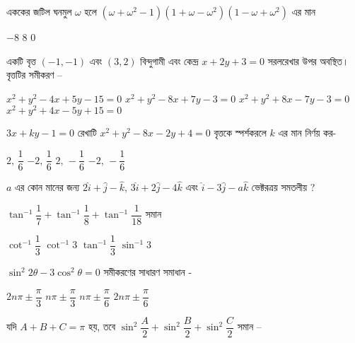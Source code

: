 \documentclass[addpoints]{exam}
\begin{document}
\begin{questions}
\question  এককের জটিল ঘনমুল $ \omega $ হলে $ (\omega +\omega^{2}-1)(1+\omega -\omega^{2})(1-\omega +\omega^{2}) $ এর মান

\begin{oneparchoices}
\choice $ -8 $
\choice $ 8 $
\choice  $ 0 $
\end{oneparchoices}

\question  একটি বৃত্ত $ (-1,-1) $ এবং $ (3,2) $ বিন্দুগামী এবং কেন্দ্র $ x+2y+3=0 $ সরলরেখার উপর অবস্থিত। বৃত্তটির সমীকরণ –

\begin{oneparchoices}
\choice  $ x^{2}+y^{2}-4x+5y-15=0 $
\choice  $ x^{2}+y^{2}-8x+7y-3=0 $
\choice  $ x^{2}+y^{2}+8x-7y-3=0 $
\choice  $ x^{2}+y^{2}+4x-5y+15=0 $
\end{oneparchoices}

\question $ 3x+ky-1=0 $ রেখাটি $ x^{2}+y^{2}-8x-2y+4=0 $ বৃত্তকে স্পর্শকরলে $ k $ এর মান নির্ণয় কর-

\begin{oneparchoices}
\choice $ 2,\,\dfrac{1}{6} $
\choice $ -2,\,\dfrac{1}{6} $
\choice $ 2,\,-\dfrac{1}{6} $
\choice  $ -2,\,-\dfrac{1}{6} $
\end{oneparchoices}

\question  $ a $ এর কোন মানের জন্য $ 2\hat{i} +\hat{j}-\hat{k} $, $ 3\hat{i} +2\hat{j}-4\hat{k} $ এবং $ \hat{i} -3\hat{j}-a\hat{k} $ ভেক্টরত্রয় সমতলীয় ?

\begin{oneparchoices}
\end{oneparchoices}

\question  $ \tan^{-1}{\dfrac{1}{7}}+\tan^{-1}{\dfrac{1}{8}} + \tan^{-1}{\dfrac{1}{18}} $ সমান

\begin{oneparchoices}
\choice $ \cot^{-1}{\dfrac{1}{3}} $
\choice $ \cot^{-1}3 $
\choice $ \tan^{-1}{\dfrac{1}{3}} $
\choice $ \sin^{-1}3 $
\end{oneparchoices}

\question  $ \sin^{2}2\theta - 3\cos^{2}\theta = 0 $ সমীকরণের সাধারণ সমাধান - 

\begin{oneparchoices}
\choice $ 2n\pi \pm \dfrac{\pi}{3} $
\choice $ n\pi \pm \dfrac{\pi}{3} $
\choice $ n\pi \pm \dfrac{\pi}{6} $
\choice $ 2n\pi \pm \dfrac{\pi}{6} $
\end{oneparchoices}

\question যদি $ A+B+C = \pi $ হয়, তবে $ \sin^{2}\dfrac{A}{2}+\sin^{2}\dfrac{B}{2}+\sin^{2}\dfrac{C}{2} $ সমান – 


\end{questions}
\end{document}

